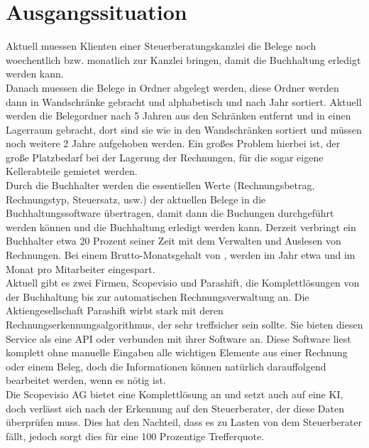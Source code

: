 \documentclass[12pt]{article}
\theoremstyle{definition}
\begin{document}
\section{Ausgangssituation}

	Aktuell muessen Klienten einer Steuerberatungskanzlei die Belege noch woechentlich bzw. monatlich zur Kanzlei bringen, damit die Buchhaltung erledigt werden kann. \\
	
	Danach muessen die Belege in Ordner abgelegt werden, diese Ordner werden dann in Wandschränke gebracht und alphabetisch und nach Jahr sortiert. Aktuell werden die Belegordner nach 5 Jahren aus den Schränken entfernt und in einen Lagerraum gebracht, dort sind sie wie in den Wandschränken sortiert und müssen noch weitere 2 Jahre aufgehoben werden. Ein großes Problem hierbei ist, der große Platzbedarf bei der Lagerung der Rechnungen, für die sogar eigene Kellerabteile gemietet werden.\\
	
	Durch die Buchhalter werden die essentiellen Werte (Rechnungsbetrag, Rechnungstyp, Steuersatz, usw.) der aktuellen Belege in die Buchhaltungssoftware übertragen, damit dann die Buchungen durchgeführt werden können und die Buchhaltung erledigt werden kann.
	Derzeit verbringt ein Buchhalter etwa 20 Prozent seiner Zeit mit dem Verwalten und Auslesen von Rechnungen. Bei einem Brutto-Monatsgehalt von , werden im Jahr etwa  und im Monat  pro Mitarbeiter eingespart.\\
	
	Aktuell gibt es zwei Firmen, Scopevisio und Parashift, die Komplettlösungen von der Buchhaltung bis zur automatischen Rechnungsverwaltung an. 
	Die Aktiengesellschaft Parashift wirbt stark mit deren Rechnungserkennungsalgorithmus, der sehr treffsicher sein sollte. Sie bieten diesen Service als eine API oder verbunden mit ihrer Software an. Diese Software liest komplett ohne manuelle Eingaben alle wichtigen Elemente aus einer Rechnung oder einem Beleg, doch die Informationen können natürlich darauffolgend bearbeitet werden, wenn es nötig ist.\\	
	
	Die Scopevisio AG bietet eine Komplettlösung an und setzt auch auf eine KI, doch verlässt sich nach der Erkennung auf den Steuerberater, der diese Daten überprüfen muss. Dies hat den Nachteil, dass es zu Lasten von dem Steuerberater fällt, jedoch sorgt dies für eine 100 Prozentige Trefferquote. \\
	
\end{document}
